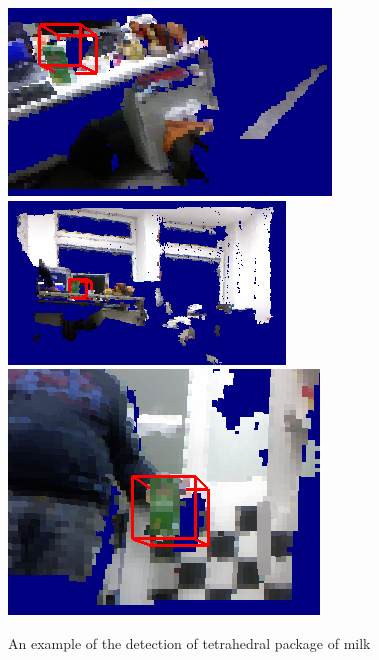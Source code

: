 \documentclass[conference]{sty/IEEEtran}
\begin{document}
\begin{figure}[htb!]
  \begin{center}
    \includegraphics[width=.45\columnwidth]{figures/colorCHLAC/detection7.png}
\hfill
    \includegraphics[width=.45\columnwidth]{figures/colorCHLAC/detection5.png} \\
\hfill
    \includegraphics[width=.9\columnwidth]{figures/colorCHLAC/detection2.png}
\caption{An example of the detection of tetrahedral package of milk}
    \label{fig:milk_testing}
  \end{center}
\end{figure}
\end{document}
